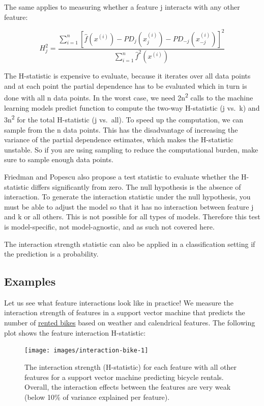 \documentclass[
  12pt,
]{krantz}
\begin{document}
The same applies to measuring whether a feature j interacts with any other feature:

\[H^2_{j}=\frac{\sum_{i=1}^n\left[\hat{f}(x^{(i)})-PD_j(x_j^{(i)})-PD_{-j}(x_{-j}^{(i)})\right]^2}{\sum_{i=1}^n\hat{f}^2(x^{(i)})}\]

The H-statistic is expensive to evaluate, because it iterates over all data points and at each point the partial dependence has to be evaluated which in turn is done with all n data points.
In the worst case, we need 2n\textsuperscript{2} calls to the machine learning models predict function to compute the two-way H-statistic (j vs.~k) and 3n\textsuperscript{2} for the total H-statistic (j vs.~all).
To speed up the computation, we can sample from the n data points.
This has the disadvantage of increasing the variance of the partial dependence estimates, which makes the H-statistic unstable.
So if you are using sampling to reduce the computational burden, make sure to sample enough data points.

Friedman and Popescu also propose a test statistic to evaluate whether the H-statistic differs significantly from zero.
The null hypothesis is the absence of interaction.
To generate the interaction statistic under the null hypothesis, you must be able to adjust the model so that it has no interaction between feature j and k or all others.
This is not possible for all types of models.
Therefore this test is model-specific, not model-agnostic, and as such not covered here.

The interaction strength statistic can also be applied in a classification setting if the prediction is a probability.

\hypertarget{examples-2}{%
\subsection{Examples}\label{examples-2}}

Let us see what feature interactions look like in practice!
We measure the interaction strength of features in a support vector machine that predicts the number of \protect\hyperlink{bike-data}{rented bikes} based on weather and calendrical features.
The following plot shows the feature interaction H-statistic:

\begin{figure}

{\centering \texttt{[image: images/interaction-bike-1]} 

}

\caption{The interaction strength (H-statistic) for each feature with all other features for a support vector machine predicting bicycle rentals. Overall, the interaction effects between the features are very weak (below 10\% of variance explained per feature).}\label{fig:interaction-bike}
\end{figure}
\end{document}
